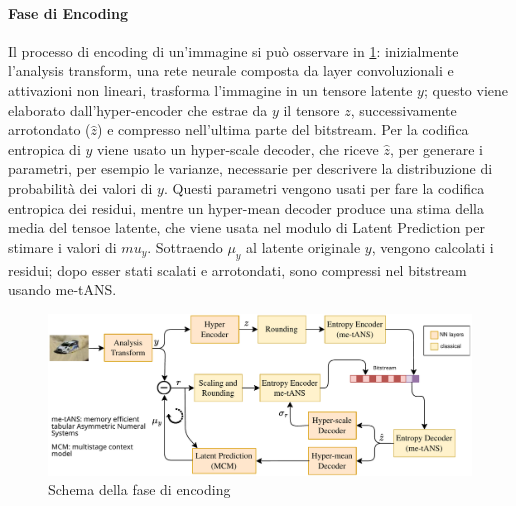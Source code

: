 \paragraph{Fase di Encoding}
Il processo di encoding di un'immagine si può osservare in \ref{fig:encodingJPEGAI}: inizialmente l'analysis transform, una rete neurale composta da layer convoluzionali e  attivazioni non lineari, trasforma l'immagine in un tensore latente $y$; questo viene elaborato dall'hyper-encoder che estrae da $y$ il tensore $z$, successivamente arrotondato ($\hat{z}$) e compresso nell'ultima parte del bitstream.
Per la codifica entropica di $y$  viene usato un hyper-scale decoder, che riceve $\hat{z}$, per generare i parametri, per esempio le varianze, necessarie per descrivere la distribuzione di probabilità dei valori di $y$. Questi parametri vengono usati per fare la codifica entropica dei residui, mentre un hyper-mean decoder produce una stima  della media del tensoe latente, che viene usata nel modulo di Latent Prediction per stimare i valori di $mu_y$.
Sottraendo $\mu_y$ al latente originale $y$, vengono calcolati i residui; dopo esser stati scalati e arrotondati, sono compressi nel bitstream usando me-tANS.\\
\begin{figure}
    \centering
    \includegraphics[width=1\linewidth]{img/encongdingJPEGAI.png}
    \caption{Schema della fase di encoding}
    \label{fig:encodingJPEGAI}
\end{figure}
